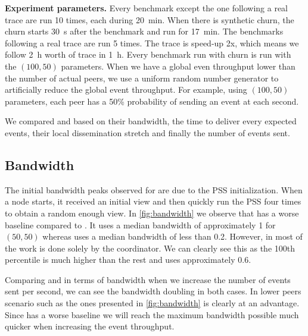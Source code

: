 \textbf{Experiment parameters.} Every benchmark except the one following a real trace are run 10 times, each during \SI{20}{\minute}. When there is synthetic churn, the churn starts \SI{30}{\second} after the benchmark and run for \SI{17}{\minute}. The benchmarks following a real trace are run 5 times. The trace is speed-up 2x, which means we follow \SI{2}{\hour} worth of trace in \SI{1}{\hour}. Every benchmark run with churn is run with the $(100,50)$ parameters. When we have a global even throughput lower than the number of actual peers, we use a uniform random number generator to artificially reduce the global event throughput. For example, using $(100,50)$ parameters, each peer has a 50\% probability of sending an event at each second.
\par
We compared \epto and \jgroups based on their bandwidth, the time to deliver every expected events, their local dissemination stretch and finally the number of events sent.
\subsection{Bandwidth}
The initial bandwidth peaks observed for \epto are due to the PSS initialization. When a node starts, it received an initial view and then quickly run the PSS four times to obtain a random enough view.
% 	
In \autoref{fig:bandwidth} we observe that \epto has a worse baseline compared to \jgroups. It uses a median bandwidth of approximately \SI{1}{\mbps} for $(50,50)$ whereas \jgroups uses a median bandwidth of less than \SI{0.2}{\mbps}. However, in \jgroups most of the work is done solely by the coordinator. We can clearly see this as the 100th percentile is much higher than the rest and uses approximately \SI{.6}{\mbps}.

Comparing \epto and \jgroups in terms of bandwidth when we increase the number of events sent per second, we can see the bandwidth doubling in both cases. In lower peers scenario such as the ones presented in \autoref{fig:bandwidth} \jgroups is clearly at an advantage. Since \epto has a worse baseline we will reach the maximum bandwidth possible much quicker when increasing the event throughput.

